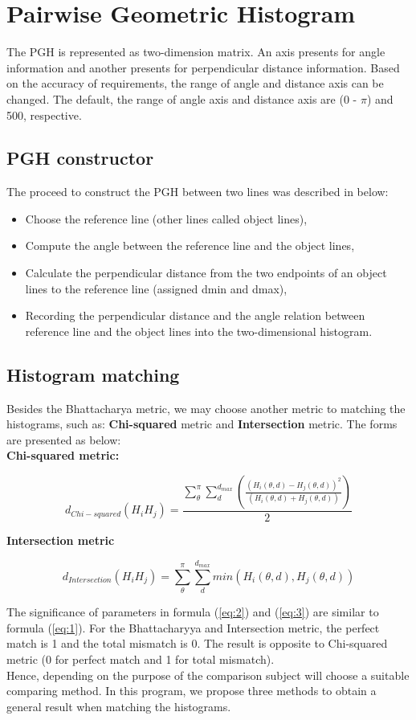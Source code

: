\section{Pairwise Geometric Histogram}
The PGH is represented as two-dimension matrix. An axis presents for angle information and another presents for perpendicular distance information. Based on the accuracy of requirements, the range of angle and distance axis can be changed. The default, the range of angle axis and distance axis are ($0$ - $\pi$) and 500, respective.
\subsection{PGH constructor}
The proceed to construct the PGH between two lines was described in below:
\begin{itemize}
\item Choose the reference line (other lines called object lines),
\item Compute the angle between the reference line and the object lines,
\item Calculate the perpendicular distance from the two endpoints of an object lines to the reference line (assigned dmin and dmax),
\item Recording the perpendicular distance and the angle relation between reference line and the object lines into the two-dimensional histogram.
\end{itemize}
\subsection{Histogram matching}
Besides the Bhattacharya metric, we may choose another metric to matching the histograms, such as: \textbf{Chi-squared} metric and \textbf{Intersection} metric. The forms are presented as below:\\
\textbf{Chi-squared metric:}
\begin{center}
\begin{equation}\label{eq:2}
d_{Chi-squared} (H_{i}H_{j}) = \frac{\sum\limits_{\theta}^{\pi}\sum\limits_{d}^{d_{max}}(\frac{(H_{i}(\theta,d) - H_{j}(\theta,d))^{2}}{(H_{i}(\theta,d) + H_{j}(\theta,d))})}{2}
\end{equation}
\end{center}
\textbf{Intersection metric}
\begin{center}
\begin{equation}\label{eq:3}
d_{Intersection} (H_{i}H_{j}) = \sum\limits_{\theta}^{\pi}\sum\limits_{d}^{d_{max}}min(H_{i}(\theta,d), H_{j}(\theta,d))
\end{equation}
\end{center}
The significance of parameters in formula (\ref{eq:2}) and (\ref{eq:3}) are similar to formula (\ref{eq:1}). For the Bhattacharyya and Intersection metric, the perfect match is 1 and the total mismatch is 0. The result is opposite to Chi-squared metric (0 for perfect match and 1 for total mismatch).\\[0.2cm]
Hence, depending on the purpose of the comparison subject will choose a suitable comparing method. In this program, we propose three methods to obtain a general result when matching the histograms.
